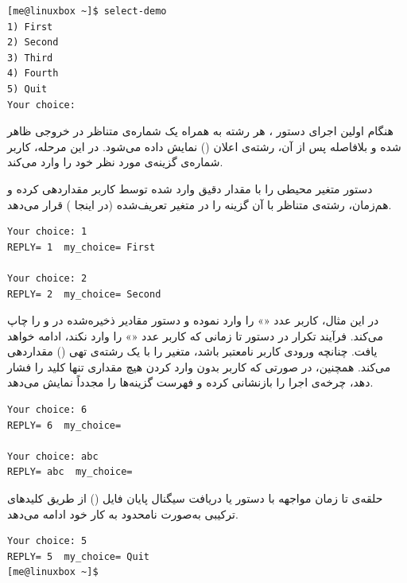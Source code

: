 \begin{latin}
\begin{lstlisting}
[me@linuxbox ~]$ select-demo
1) First
2) Second
3) Third
4) Fourth
5) Quit
Your choice:
\end{lstlisting}
\end{latin}

هنگام اولین اجرای دستور ، هر رشته به همراه یک شماره‌ی متناظر در خروجی ظاهر شده و بلافاصله پس از آن، رشته‌ی اعلان () نمایش داده می‌شود. در این مرحله، کاربر شماره‌ی گزینه‌ی مورد نظر خود را وارد می‌کند.

دستور  متغیر محیطی  را با مقدار دقیق وارد شده توسط کاربر مقداردهی کرده و هم‌زمان، رشته‌ی متناظر با آن گزینه را در متغیر تعریف‌شده (در اینجا ) قرار می‌دهد.

\begin{latin}
\begin{lstlisting}
Your choice: 1
REPLY= 1  my_choice= First

Your choice: 2
REPLY= 2  my_choice= Second
\end{lstlisting}
\end{latin}

در این مثال، کاربر عدد «» را وارد نموده و دستور  مقادیر ذخیره‌شده در  و  را چاپ می‌کند. فرآیند تکرار در دستور  تا زمانی که کاربر عدد «» را وارد نکند، ادامه خواهد یافت. چنانچه ورودی کاربر نامعتبر باشد،  متغیر  را با یک رشته‌ی تهی () مقداردهی می‌کند. همچنین، در صورتی که کاربر بدون وارد کردن هیچ مقداری تنها کلید  را فشار دهد،  چرخه‌ی اجرا را بازنشانی کرده و فهرست گزینه‌ها را مجدداً نمایش می‌دهد.

\begin{latin}
\begin{lstlisting}
Your choice: 6
REPLY= 6  my_choice=

Your choice: abc
REPLY= abc  my_choice=
\end{lstlisting}
\end{latin}

حلقه‌ی  تا زمان مواجهه با دستور  یا دریافت سیگنال پایان فایل () از طریق کلیدهای ترکیبی  به‌صورت نامحدود به کار خود ادامه می‌دهد.

\begin{latin}
\begin{lstlisting}
Your choice: 5
REPLY= 5  my_choice= Quit
[me@linuxbox ~]$
\end{lstlisting}
\end{latin}

